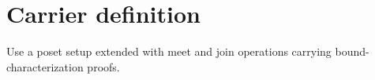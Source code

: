 \section{Carrier definition}

\begin{definition}
\label{def:lattice-carrier}
Use a poset setup extended with meet and join operations carrying bound-characterization proofs.
\end{definition}

